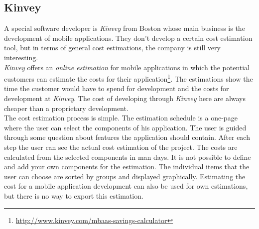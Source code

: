 \subsection{Kinvey}

A special software developer is \textit{Kinvey} from Boston whose main business is the development of mobile applications. They don't develop a certain cost estimation tool, but in terms of general cost estimations, the company is still very interesting.
\\
\textit{Kinvey} offers an \textit{online estimation} for mobile applications in which the potential customers can estimate the costs for their application\footnote{\url{http://www.kinvey.com/mbaas-savings-calculator}}. The estimations show the time the customer would have to spend for development and the costs for development at \textit{Kinvey}. The cost of developing through \textit{Kinvey} here are always cheaper than a proprietary development.
\\
The cost estimation process is simple. The estimation schedule is a one-page where the user can select the components of his application. The user is guided through some question about features the application should contain. After each step the user can see the actual cost estimation of the project.
The costs are calculated from the selected components in man days. It is not possible to define and add your own components for the estimation. The individual items that the user can choose are sorted by groups and displayed graphically. Estimating the cost for a mobile application development can also be used for own estimations, but there is no way to export this estimation.
